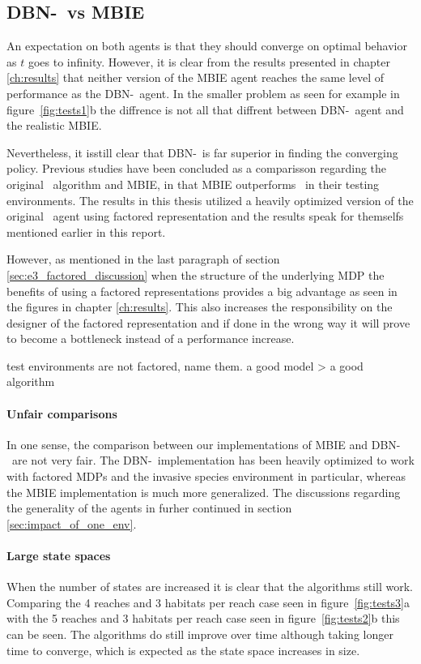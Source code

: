 \subsection{DBN-\etre\ vs MBIE }
An expectation on both agents is that they should converge on optimal behavior
as $t$ goes to infinity. However, it is clear from the results presented in
chapter \ref{ch:results} that neither version of the MBIE agent reaches the
same level of performance as the DBN-\etre\ agent. In the smaller problem as
seen for example in figure~\ref{fig:tests1}b the diffrence is not all that
diffrent between DBN-\etre\ agent and the realistic MBIE. 

Nevertheless, it isstill clear that DBN-\etre\ is far superior in finding the converging policy.
Previous studies have been concluded as a comparisson regarding the original
\etre\ algorithm and MBIE, in \textcite{strehl2004empirical} that MBIE
outperforms \etre\ in their testing environments. The results in this thesis
utilized a heavily optimized version of the original \etre\ agent using
factored representation and the results speak for themselfs mentioned earlier
in this report. 

However, as mentioned in the last paragraph of
section \ref{sec:e3_factored_discussion} when the structure of the underlying
MDP the benefits of using a factored representations provides a big advantage
as seen in the figures in chapter \ref{ch:results}. This also increases the
responsibility on the designer of the factored representation and if done in
the wrong way it will prove to become a bottleneck instead of a performance
increase. 

test environments are not factored, name them.
a good model > a good algorithm

\paragraph{Unfair comparisons}
In one sense, the comparison between our implementations of MBIE and DBN-\etre\
are not very fair. The DBN-\etre\ implementation has been heavily optimized to
work with factored MDPs and the invasive species environment in particular,
whereas the MBIE implementation is much more generalized. The discussions
regarding the generality of the agents in furher continued in section
\ref{sec:impact_of_one_env}. 

\paragraph{Large state spaces}
When the number of states are increased it is clear that the algorithms still
work. Comparing the 4 reaches and 3 habitats per reach case seen in
figure~\ref{fig:tests3}a with the 5 reaches and 3 habitats per reach case seen
in figure~\ref{fig:tests2}b this can be seen. The algorithms do still improve
over time although taking longer time to converge, which is expected as the
state space increases in size. 

